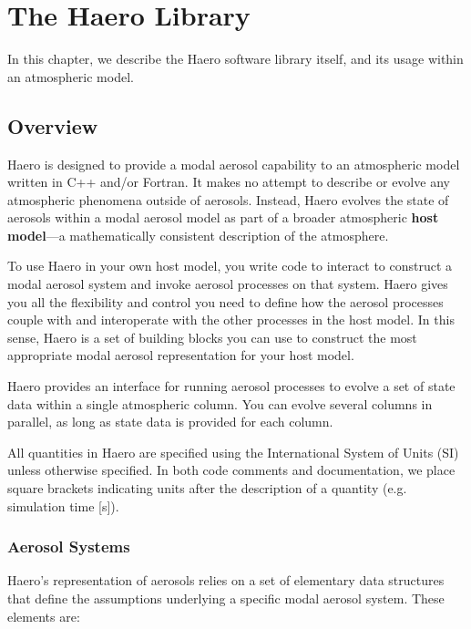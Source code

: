 \chapter{The Haero Library}

In this chapter, we describe the Haero software library itself, and its usage
within an atmospheric model.

\section{Overview}

Haero is designed to provide a modal aerosol capability to an atmospheric model
written in C++ and/or Fortran. It makes no attempt to describe or evolve any
atmospheric phenomena outside of aerosols. Instead, Haero evolves the state of
aerosols within a modal aerosol model as part of a broader atmospheric
{\bf host model}---a mathematically consistent description of the atmosphere.

To use Haero in your own host model, you write code to interact to construct
a modal aerosol system and invoke aerosol processes on that system. Haero gives
you all the flexibility and control you need to define how the aerosol processes
couple with and interoperate with the other processes in the host model. In this
sense, Haero is a set of building blocks you can use to construct the most
appropriate modal aerosol representation for your host model.

Haero provides an interface for running aerosol processes to evolve a set of
state data within a single atmospheric column. You can evolve several columns
in parallel, as long as state data is provided for each column.

All quantities in Haero are specified using the International System of Units
(SI) unless otherwise specified. In both code comments and documentation, we
place square brackets indicating units after the description of a quantity
(e.g. simulation time [s]).

\subsection{Aerosol Systems}

Haero's representation of aerosols relies on a set of elementary data structures
that define the assumptions underlying a specific modal aerosol system. These
elements are:

